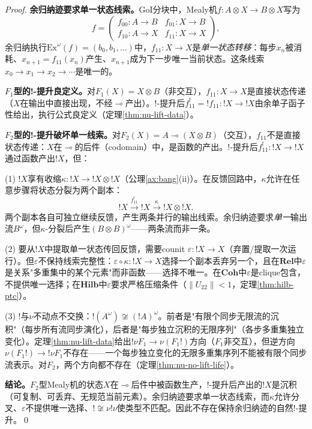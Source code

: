 \documentclass[11pt,a4paper]{article}
\newcommand{\lolli}{\multimap}
\newcommand{\bang}{{!}}
\newcommand{\tensor}{\otimes}
\newcommand{\eps}{\varepsilon}
\begin{document}
\begin{proof}
\textbf{余归纳迹要求单一状态线索。}GoI分块中，Mealy机$f:A\tensor X\to B\tensor X$写为
$$f=\begin{pmatrix}f_{00}:A\to B & f_{01}:X\to B\\ f_{10}:A\to X & f_{11}:X\to X\end{pmatrix},$$
余归纳执行$\mathrm{Ex}^\omega(f)=(b_0,b_1,\ldots)$中，$f_{11}:X\to X$是\emph{单一状态转移}：每步$x_n$被消耗、$x_{n+1}=f_{11}(x_n)$产生、$x_{n+1}$成为下一步唯一当前状态。这条线索$x_0\to x_1\to x_2\to\cdots$是唯一的。

\textbf{$F_1$型的!-提升良定义。}对$F_1(X)=X\tensor B$（非交互），$f_{11}:X\to X$是直接状态传递（$X$在输出中直接出现，不经$\lolli$产出）。!-提升后$f^\bang_{11}=\bang f_{11}:\bang X\to\bang X$由余单子函子性给出，执行公式良定义（定理\ref{thm:nu-lift-data}）。

\textbf{$F_2$型的!-提升破坏单一线索。}对$F_2(X)=A\lolli(X\tensor B)$（交互），$f_{11}$不是直接状态传递：$X$在$\lolli$的后件（codomain）中，是函数的产出。!-提升后$f^\bang_{11}:\bang X\to\bang X$通过函数产出$\bang X$，但：

(1) $\bang X$享有收缩$\kappa:\bang X\to\bang X\tensor\bang X$（公理\ref{ax:bang}(ii)）。在反馈回路中，$\kappa$允许在任意步骤将状态分裂为两个副本：
$$\bang X\xrightarrow{f^\bang_{11}}\bang X\xrightarrow{\kappa}\bang X\tensor\bang X.$$
两个副本各自可独立继续反馈，产生两条并行的输出线索。余归纳迹要求\emph{单一}输出流$B^\omega$，但$\kappa$-分裂后产生$(B\tensor B)^\omega$——两条流而非一条。

(2) 要从$\bang X$中提取单一状态传回反馈，需要counit $\eps:\bang X\to X$（弃置/提取一次运行）。但$\eps$不保持线索完整性：$\eps\circ\kappa:\bang X\to X$选择一个副本丢弃另一个，且在$\mathbf{Rel}$中$\eps$是关系"多重集中的某个元素"而非函数——选择不唯一。在$\mathbf{Coh}$中$\eps$是clique包含，不提供唯一选择；在$\mathbf{Hilb}$中$\eps$要求严格压缩条件（$\|U_{22}\|<1$，定理\ref{thm:hilb-ptc}）。

(3) $\bang$与$\nu$不动点不交换：$\bang(A^\omega)\not\cong(\bang A)^\omega$。前者是"有限个同步无限流的沉积"（每步所有流同步演化），后者是"每步独立沉积的无限序列"（各步多重集独立变化）。定理\ref{thm:nu-lift-data}给出$\bang\nu F_1\to\nu(F_1\bang)$方向（$F_1$非交互），但逆方向$\nu(F_1\bang)\to\bang\nu F_1$不存在——一个每步独立变化的无限多重集序列不能被有限个同步流表示。对$F_2$，两个方向都不存在（定理\ref{thm:nu-no-lift-life}）。

\textbf{结论。}$F_2$型Mealy机的状态$X$在$\lolli$后件中被函数生产，!-提升后产出的$\bang X$是沉积（可复制、可丢弃、无规范当前元素）。余归纳迹要求单一状态线索，而$\kappa$允许分叉、$\eps$不提供唯一选择、$\bang\not\cong\nu\bang\nu$使类型不匹配。因此不存在保持余归纳迹的自然!-提升。\qed
\end{proof}
\end{document}

